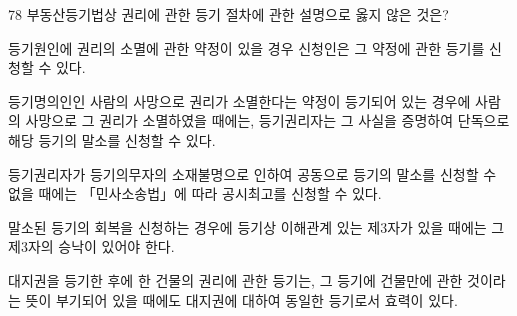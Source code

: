 \begin{question}{78}
부동산등기법상 권리에 관한 등기 절차에 관한 설명으로 옳지 않은 것은?
\begin{choices}
  \item 등기원인에 권리의 소멸에 관한 약정이 있을 경우 신청인은 그 약정에 관한 등기를 신청할 수 있다.
  \item 등기명의인인 사람의 사망으로 권리가 소멸한다는 약정이 등기되어 있는 경우에 사람의 사망으로 그 권리가 소멸하였을 때에는, 등기권리자는 그 사실을 증명하여 단독으로 해당 등기의 말소를 신청할 수 있다.
  \item 등기권리자가 등기의무자의 소재불명으로 인하여 공동으로 등기의 말소를 신청할 수 없을 때에는 「민사소송법」에 따라 공시최고를 신청할 수 있다.
  \item 말소된 등기의 회복을 신청하는 경우에 등기상 이해관계 있는 제3자가 있을 때에는 그 제3자의 승낙이 있어야 한다.
  \item 대지권을 등기한 후에 한 건물의 권리에 관한 등기는, 그 등기에 건물만에 관한 것이라는 뜻이 부기되어 있을 때에도 대지권에 대하여 동일한 등기로서 효력이 있다.
\end{choices}
\end{question}
